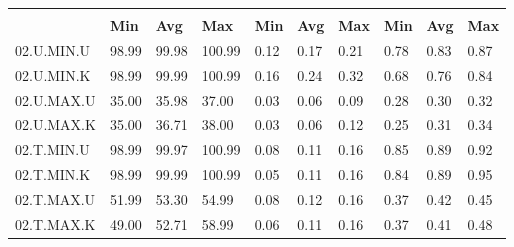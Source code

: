 \begin{tabular}{|>{\raggedright}p{}|>{\raggedright}p{}|>{\raggedright}p{}|>{\raggedright}p{}|>{\raggedright}p{}|>{\raggedright}p{}|>{\raggedright}p{}|>{\raggedright}p{}|>{\raggedright}p{}|>{\raggedright}p{}|}
\hline 
\multirow{2}{0.12\columnwidth}{\textbf{\footnotesize{}Bezeichnung}} & \multicolumn{3}{l|}{\textbf{\footnotesize{}CPU-Last {[}\%{]}}} & \multicolumn{3}{l|}{\textbf{\footnotesize{}Systemtime {[}s{]}}} & \multicolumn{3}{l|}{\textbf{\footnotesize{}Usertime {[}s{]}}}\tabularnewline
\cline{2-10} 
& \textbf{\footnotesize{}Min} & \textbf{\footnotesize{}Avg} & \textbf{\footnotesize{}Max} & \textbf{\footnotesize{}Min} & \textbf{\footnotesize{}Avg} & \textbf{\footnotesize{}Max} & \textbf{\footnotesize{}Min} & \textbf{\footnotesize{}Avg} & \textbf{\footnotesize{}Max}\tabularnewline
\hline 
\hline 
{\footnotesize{}02.U.MIN.U} & {\footnotesize{}98.99} & {\footnotesize{}99.98} & {\footnotesize{}100.99} & {\footnotesize{}0.12} & {\footnotesize{}0.17} & {\footnotesize{}0.21} & {\footnotesize{}0.78} & {\footnotesize{}0.83} & {\footnotesize{}0.87}\tabularnewline
\hline 
\hline 
{\footnotesize{}02.U.MIN.K} & {\footnotesize{}98.99} & {\footnotesize{}99.99} & {\footnotesize{}100.99} & {\footnotesize{}0.16} & {\footnotesize{}0.24} & {\footnotesize{}0.32} & {\footnotesize{}0.68} & {\footnotesize{}0.76} & {\footnotesize{}0.84}\tabularnewline
\hline 
\hline 
{\footnotesize{}02.U.MAX.U} & {\footnotesize{}35.00} & {\footnotesize{}35.98} & {\footnotesize{}37.00} & {\footnotesize{}0.03} & {\footnotesize{}0.06} & {\footnotesize{}0.09} & {\footnotesize{}0.28} & {\footnotesize{}0.30} & {\footnotesize{}0.32}\tabularnewline
\hline 
\hline 
{\footnotesize{}02.U.MAX.K} & {\footnotesize{}35.00} & {\footnotesize{}36.71} & {\footnotesize{}38.00} & {\footnotesize{}0.03} & {\footnotesize{}0.06} & {\footnotesize{}0.12} & {\footnotesize{}0.25} & {\footnotesize{}0.31} & {\footnotesize{}0.34}\tabularnewline
\hline 
\hline 
{\footnotesize{}02.T.MIN.U} & {\footnotesize{}98.99} & {\footnotesize{}99.97} & {\footnotesize{}100.99} & {\footnotesize{}0.08} & {\footnotesize{}0.11} & {\footnotesize{}0.16} & {\footnotesize{}0.85} & {\footnotesize{}0.89} & {\footnotesize{}0.92}\tabularnewline
\hline 
\hline 
{\footnotesize{}02.T.MIN.K} & {\footnotesize{}98.99} & {\footnotesize{}99.99} & {\footnotesize{}100.99} & {\footnotesize{}0.05} & {\footnotesize{}0.11} & {\footnotesize{}0.16} & {\footnotesize{}0.84} & {\footnotesize{}0.89} & {\footnotesize{}0.95}\tabularnewline
\hline 
\hline 
{\footnotesize{}02.T.MAX.U} & {\footnotesize{}51.99} & {\footnotesize{}53.30} & {\footnotesize{}54.99} & {\footnotesize{}0.08} & {\footnotesize{}0.12} & {\footnotesize{}0.16} & {\footnotesize{}0.37} & {\footnotesize{}0.42} & {\footnotesize{}0.45}\tabularnewline
\hline 
\hline 
{\footnotesize{}02.T.MAX.K} & {\footnotesize{}49.00} & {\footnotesize{}52.71} & {\footnotesize{}58.99} & {\footnotesize{}0.06} & {\footnotesize{}0.11} & {\footnotesize{}0.16} & {\footnotesize{}0.37} & {\footnotesize{}0.41} & {\footnotesize{}0.48}\tabularnewline
\hline 
\end{tabular}
\par
